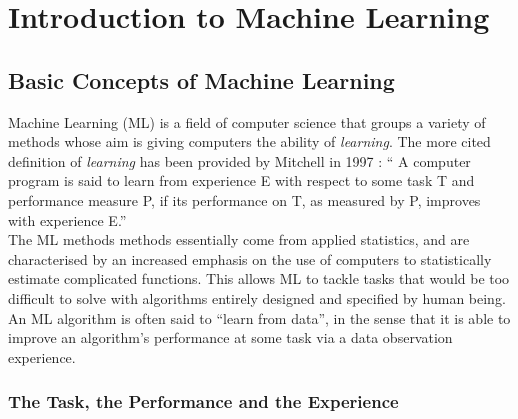 
\chapter{Introduction to Machine Learning} %

\label{ChapterIntroML}


\section{Basic Concepts of Machine Learning}
Machine Learning (ML) is a field of computer science that groups a variety of  methods whose aim is giving computers the ability of \emph{learning}. The more cited definition of \emph{learning} has been provided by Mitchell in 1997 \cite{Mitchell1997}: \enquote{ A computer program is said to learn from experience E with respect to some task T and performance measure P, if its performance on T, as measured by P, improves with experience E.} \\
The ML methods methods essentially come from applied statistics, and are characterised by an increased emphasis on the use of computers to statistically estimate complicated functions. This allows ML to tackle tasks that would be too difficult to solve with algorithms entirely designed and specified by human being. An ML algorithm is often said to \enquote{learn from data}, in the sense that it is able to improve an algorithm's performance at some task via a data observation experience.

\subsection{The Task, the Performance and the Experience}\label{sec:TPE}
